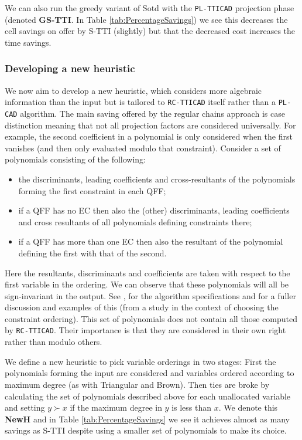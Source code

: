 \documentclass[runningheads,a4paper]{llncs}
\begin{document}
We can also run the greedy variant of Sotd with the \texttt{PL-TTICAD} projection phase (denoted \textbf{GS-TTI}.  In Table \ref{tab:PercentageSavings}) we see this decreases the cell savings on offer by S-TTI (slightly) but that the decreased cost increases the time savings.  

\subsubsection{Developing a new heuristic}

We now aim to develop a new heuristic, which considers more algebraic information than the input but is tailored to \texttt{RC-TTICAD} itself rather than a \texttt{PL-CAD} algorithm.  
The main saving offered by the regular chains approach is case distinction meaning that not all projection factors are considered universally.  For example, the second coefficient in a polynomial is only considered when the first vanishes (and then only evaluated modulo that constraint).  Consider a set of polynomials consisting of the following:
\begin{itemize}
\item the discriminants, leading coefficients and cross-resultants of the polynomials forming the first constraint in each QFF;
\item if a QFF has no EC then also the (other) discriminants, leading coefficients and cross resultants of all polynomials defining constraints there;
\item if a QFF has more than one EC then also the resultant of the polynomial defining the first with that of the second.
\end{itemize}
Here the resultants, discriminants and coefficients are taken with respect to the first variable in the ordering.  We can observe that these polynomials will all be sign-invariant in the output.  See \cite{BCDEMW14}, \cite{CM12b} for the algorithm specifications and \cite{EBCDMW14} for a fuller discussion and examples of this (from a study in the context of choosing the constraint ordering).  This set of polynomials does not contain all those computed by \texttt{RC-TTICAD}.
Their importance is that they are considered in their own right rather than modulo others.  

We define a new heuristic to pick variable orderings in two stages:  First the polynomials forming the input are considered and variables ordered according to maximum degree (as with Triangular and Brown).  Then ties are broke by calculating the set of polynomials described above for each unallocated variable and setting $y \succ x$ if the maximum degree in $y$ is less than $x$.  We denote this \textbf{NewH} and in Table \ref{tab:PercentageSavings} we see it achieves almost as many savings as S-TTI despite using a smaller set of polynomials to make its choice.  
\end{document}
